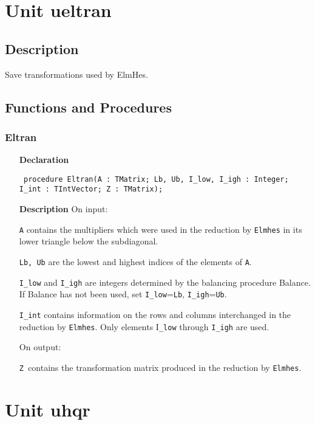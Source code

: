 \documentclass[12pt,a4paper,oneside]{report}
\newcommand{\declarationitem}[1]{\textbf{#1}}
\newcommand{\descriptiontitle}[1]{\textbf{#1}}
\newcommand{\code}[1]{\texttt{#1}}
\begin{document}
\section{Unit ueltran}
\label{ueltran}
\subsection{Description}
Save transformations used by ElmHes. 
\subsection{Functions and Procedures}
\subsubsection{Eltran}
\label{ueltran-Eltran}
\begin{itemize}\item[\declarationitem{Declaration}\hfill]
	\begin{flushleft}
		\code{
			procedure Eltran(A : TMatrix; Lb, Ub, I{\_}low, I{\_}igh : Integer; I{\_}int : TIntVector; Z : TMatrix);}
	\end{flushleft}
	\item[\descriptiontitle{Description}]
	On input:
	
	\code{A} contains the multipliers which were used in the reduction by \code{Elmhes} in its lower triangle below the subdiagonal.
	
	\code{Lb, Ub} are the lowest and highest indices of the elements of \code{A}.
	
	\code{I{\_}low} and \code{I{\_}igh} are integers determined by the balancing procedure Balance. If Balance has not been used, set \code{I{\_}low}=\code{Lb}, \code{I{\_}igh}=\code{Ub}.
	
	\code{I{\_}int} contains information on the rows and columns interchanged in the reduction by \code{Elmhes}. Only elements I\code{{\_}low} through \code{I{\_}igh} are used.
	
	On output:
	
	\code{Z }contains the transformation matrix produced in the reduction by \code{Elmhes}.
	
\end{itemize}

\section{Unit uhqr}
\label{uhqr}
\end{document}
